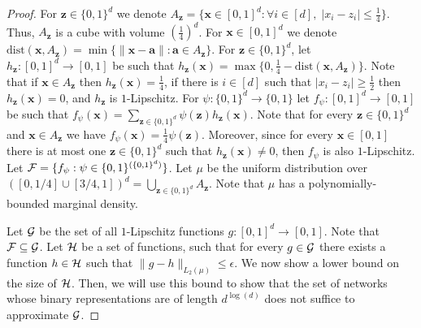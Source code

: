 \documentclass[11pt]{article}
\newcommand{\ba}{\mathbf{a}}
\newcommand{\bx}{\mathbf{x}}
\newcommand{\bz}{\mathbf{z}}
\newcommand{\cg}{{\cal G}}
\newcommand{\ch}{{\cal H}}
\newcommand{\cf}{{\cal F}}
\newcommand{\norm}[1]{\left\|#1\right\|}
\newcommand{\snorm}[1]{\|#1\|} %
\begin{document}
\begin{proof}
	For $\bz \in \{0,1\}^d$ we denote $A_\bz = \{\bx \in [0,1]^d: \forall i \in [d], \; |x_i-z_i| \leq \frac{1}{4}\}$. Thus, $A_\bz$ is a cube with volume $\left(\frac{1}{4}\right)^d$. For $\bx \in [0,1]^d$ we denote $\text{dist}(\bx,A_\bz)=\min\{\norm{\bx-\ba}: \ba \in A_\bz\}$. For $\bz \in \{0,1\}^d$, let $h_\bz:[0,1]^d \rightarrow [0,1]$ be such that $h_\bz(\bx) = \max\{0, \frac{1}{4} - \text{dist}(\bx,A_\bz)\}$. Note that if $\bx \in A_\bz$ then $h_\bz(\bx)=\frac{1}{4}$, if there is $i \in [d]$ such that $|x_i-z_i| \geq \frac{1}{2}$ then $h_\bz(\bx)=0$, and $h_\bz$ is $1$-Lipschitz. For $\psi:\{0,1\}^d \rightarrow \{0,1\}$ let $f_\psi:[0,1]^d \rightarrow [0,1]$ be such that 
	$f_\psi(\bx) = \sum_{\bz \in \{0,1\}^d}\psi(\bz) h_\bz(\bx)$.
	Note that for every $\bz \in \{0,1\}^d$ and $\bx \in A_\bz$ we have $f_\psi(\bx) = \frac{1}{4} \psi(\bz)$. Moreover, since for every $\bx \in [0,1]$ there is at most one $\bz \in \{0,1\}^d$ such that $h_\bz(\bx) \neq 0$, then $f_\psi$ is also $1$-Lipschitz. Let $\cf = \{f_\psi: \psi \in \{0,1\}^{(\{0,1\}^d)}\}$. 
	Let $\mu$ be the uniform distribution over $([0,1/4] \cup [3/4,1])^d = \bigcup_{\bz \in \{0,1\}^d}A_\bz$. Note that $\mu$ has a polynomially-bounded marginal density.
	
	Let $\cg$ be the set of all $1$-Lipschitz functions $g:[0,1]^d \rightarrow [0,1]$. Note that $\cf \subseteq \cg$.
	Let $\ch$ be a set of functions, such that for every $g \in \cg$ there exists a function $h \in \ch$ such that $\snorm{g-h}_{L_2(\mu)} \leq \epsilon$. We now show a lower bound on the size of $\ch$. Then, we will use this bound to show that the set of networks whose binary representations are of length $d^{\log(d)}$ does not suffice to approximate $\cg$.
	

\end{proof}
\end{document}
